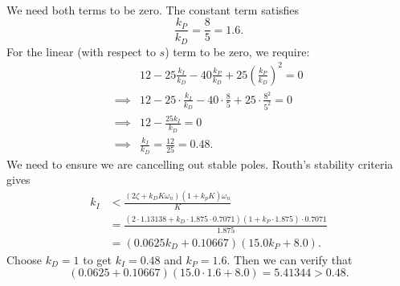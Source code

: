 \documentclass{article}
\numberwithin{equation}{section}
\begin{document}
\begin{enumerate}[label=\textbf{2.\arabic*}]
\begin{enumerate}[label=(\alph*)]
\begin{align}
        \end{align}
        We need both terms to be zero. The constant term satisfies 
        \begin{equation}
            \frac{k_P}{k_D} = \frac{8}{5} = 1.6.
        \end{equation}
        For the linear (with respect to $s$) term to be zero, we require:
        \begin{align}
            &12 - 25\frac{k_I}{k_D} - 40\frac{k_P}{k_D} + 25\left(\frac{k_P}{k_D}\right)^2 =0 \\ 
            \implies & 12 - 25 \cdot \frac{k_I}{k_D} - 40 \cdot \frac{8}{5} + 25 \cdot \frac{8^2}{5^2} = 0\\
            \implies & 12 - \frac{25 k_{I}}{k_{D}} = 0 \\ 
            \implies & \frac{k_I}{k_D} = \frac{12}{25} = 0.48.
        \end{align}
        We need to ensure we are cancelling out stable poles. Routh's stability criteria gives 
        \begin{align}
            k_I &< \frac{(2\zeta+k_DK\omega_n)(1+k_pK)\omega_n}{K} \\ 
            &= \frac{(2 \cdot 1.13138 + k_D \cdot 1.875 \cdot 0.7071)(1+k_P \cdot 1.875) \cdot 0.7071}{1.875} \\ 
            &=  (0.0625 k_{D} + 0.10667) (15.0 k_{P} + 8.0).
        \end{align}
        Choose $k_D = 1$ to get $k_I = 0.48$ and $k_P=1.6.$ Then we can verify that 
        \begin{equation}
            (0.0625  + 0.10667) (15.0 \cdot 1.6 + 8.0)=  5.41344 > 0.48.
        \end{equation}
    \end{enumerate}
\end{enumerate}
\end{document}
